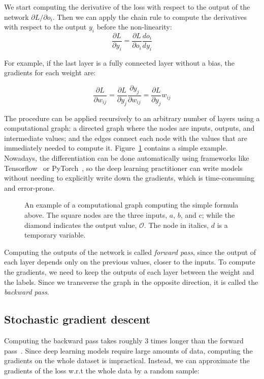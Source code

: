 We start computing the derivative of the loss with respect to the output of the network ${\partial L}/{\partial o_i}$.
Then we can apply the chain rule to compute the derivatives with respect to the output $y_i$ before the non-linearity:
\begin{equation*}
\frac{\partial L}{\partial y_i} = \frac{\partial L}{\partial o_i} \frac{d o_i}{d y_i}
\end{equation*}

For example, if the last layer is a fully connected layer without a bias, the gradients for each weight are:

\begin{equation*}
\frac{\partial L}{\partial w_{ij}} = \frac{\partial L}{\partial y_j} \frac{\partial y_j}{\partial w_{ij}} =  \frac{\partial L}{\partial y_j}  w_{ij}
\end{equation*}

The procedure can be applied recursively to an arbitrary number of layers using a computational graph: 
a directed graph where the nodes are inputs, outputs, and intermediate values; and the edges connect each node with the values that are immediately needed to compute it.
Figure~\ref{fig:comp_graph} contains a simple example.
Nowadays, the differentiation can be done automatically using frameworks like Tensorflow~\citep{tensorflow} or PyTorch~\citep{pytorch}, so the deep learning practitioner can write models without needing to explicitly write down the gradients, which is time-consuming and error-prone.

\begin{figure}[bht]
	\centering
	\caption{An example of a computational graph computing the simple formula above.
	The square nodes are the three inputs, $a$, $b$, and $c$; while the diamond indicates the output value, $\mathcal{O}$.
    The node in italics, $\mathit{d}$ is a temporary variable.}\label{fig:comp_graph}
\end{figure}


Computing the outputs of the network is called \emph{forward pass}, since the output of each layer  
depends only on the previous values, closer to the inputs.
To compute the gradients, we need to keep the outputs of each layer between the weight and the labels.
Since we transverse the graph in the opposite direction, it is called the \emph{backward pass}.

\subsection{Stochastic gradient descent}\label{sec:sgd}
Computing the backward pass takes roughly 3 times longer than the forward pass~\citep{dl_course}.
Since deep learning models require large amounts of data, computing the gradients on the whole dataset is impractical.
Instead, we can approximate the gradients of the loss w.r.t the whole data by a random sample:

